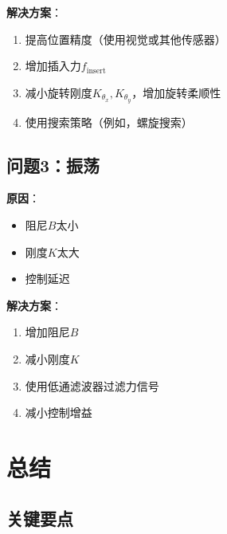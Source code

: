 \documentclass[12pt,a4paper]{article}
\begin{document}
\textbf{解决方案}：
\begin{enumerate}
\item 提高位置精度（使用视觉或其他传感器）
\item 增加插入力$f_{\text{insert}}$
\item 减小旋转刚度$K_{\theta_x}, K_{\theta_y}$，增加旋转柔顺性
\item 使用搜索策略（例如，螺旋搜索）
\end{enumerate}

\subsection{问题3：振荡}

\textbf{原因}：
\begin{itemize}
\item 阻尼$B$太小
\item 刚度$K$太大
\item 控制延迟
\end{itemize}

\textbf{解决方案}：
\begin{enumerate}
\item 增加阻尼$B$
\item 减小刚度$K$
\item 使用低通滤波器过滤力信号
\item 减小控制增益
\end{enumerate}

\section{总结}

\subsection{关键要点}
\end{document}

